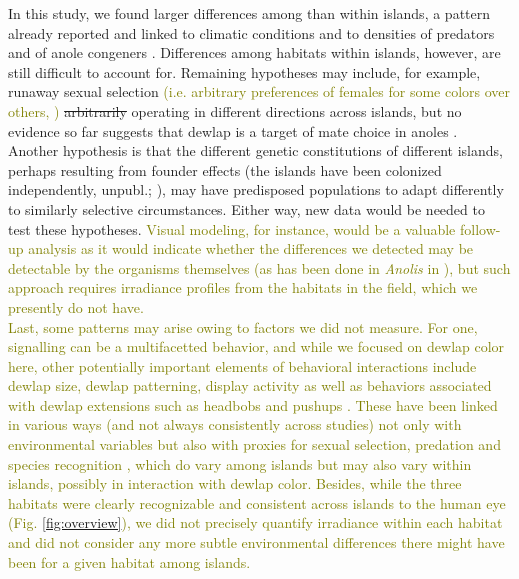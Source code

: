 In this study, we found larger differences among than within islands, a pattern already reported and linked to climatic conditions \citep{Driessens2017} and to densities of predators and of anole congeners \citep{Vanhooydonck2009, Baeckens2018}. Differences among habitats within islands, however, are still difficult to account for. Remaining hypotheses may include, for example, runaway sexual selection \textcolor{olive}{(i.e. arbitrary preferences of females for some colors over others, \citealt{Andersson1994})} \sout{arbitrarily} operating in different directions across islands, but no evidence so far suggests that dewlap is a target of mate choice in anoles \citep{Tokarz2002, Tokarz2005, Lailvaux2006, Nicholson2007}. Another hypothesis is that the different genetic constitutions of different islands, perhaps resulting from founder effects (the islands have been colonized independently, \citealt{vandeSchoot2016} unpubl.; \citealt{Driessens2017, Reynolds2020}), may have predisposed populations to adapt differently to similarly selective circumstances. Either way, new data would be needed to test these hypotheses. \textcolor{olive}{Visual modeling, for instance, would be a valuable follow-up analysis as it would indicate whether the differences we detected may be detectable by the organisms themselves (as has been done in \textit{Anolis} in \citealt{Leal2004, Fleishman2020}), but such approach requires irradiance profiles from the habitats in the field, which we presently do not have.}\\

\textcolor{olive}{Last, some patterns may arise owing to factors we did not measure. For one, signalling can be a multifacetted behavior, and while we focused on dewlap color here, other potentially important elements of behavioral interactions include dewlap size, dewlap patterning, display activity as well as behaviors associated with dewlap extensions such as headbobs and pushups \citep{Vanhooydonck2005, Driessens2014, Driessens2015, Lailvaux2015}. These have been linked in various ways (and not always consistently across studies) not only with environmental variables but also with proxies for sexual selection, predation and species recognition \citep{Vanhooydonck2005, Lailvaux2007, Vanhooydonck2009, Driessens2017, Baeckens2018}, which do vary among islands but may also vary within islands, possibly in interaction with dewlap color. Besides, while the three habitats were clearly recognizable and consistent across islands to the human eye (Fig. \ref{fig:overview}), we did not precisely quantify irradiance within each habitat and did not consider any more subtle environmental differences there might have been for a given habitat among islands.}\\

